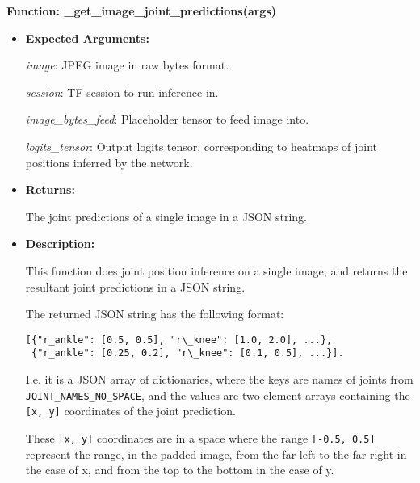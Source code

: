 \documentclass{scrreprt}
\begin{document}
\textbf{Function: \_get\_image\_joint\_predictions(args)}
\begin{itemize}
        \item \textbf{Expected Arguments:}

                \textit{image}: JPEG image in raw bytes format.

                \textit{session}: TF session to run inference in.

                \textit{image\_bytes\_feed}: Placeholder tensor to feed image
                into.

                \textit{logits\_tensor}: Output logits tensor, corresponding to
                heatmaps of joint positions inferred by the network.

    \item \textbf{Returns:}

            The joint predictions of a single image in a JSON string.

    \item \textbf{Description:}

            This function does joint position inference on a single image, and returns
                the resultant joint predictions in a JSON string.

                The returned JSON string has the following format:

\begin{verbatim}
[{"r_ankle": [0.5, 0.5], "r\_knee": [1.0, 2.0], ...},
 {"r_ankle": [0.25, 0.2], "r\_knee": [0.1, 0.5], ...}].
\end{verbatim}

                I.e. it is a JSON array of dictionaries, where the keys are
                names of joints from \verb|JOINT_NAMES_NO_SPACE|, and the
                values are two-element arrays containing the \verb|[x, y]|
                coordinates of the joint prediction.

                These \verb|[x, y]| coordinates are in a space where the range
                \verb|[-0.5, 0.5]| represent the range, in the padded image,
                from the far left to the far right in the case of x, and from
                the top to the bottom in the case of y.

\end{itemize}
\end{document}
